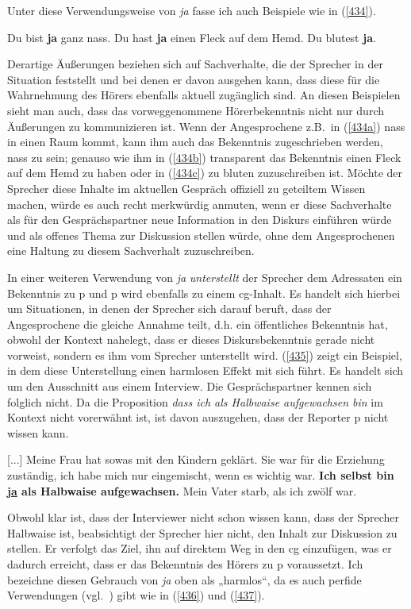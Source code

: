 Unter diese Verwendungsweise von \textit{ja} fasse ich auch Beispiele wie in (\ref{434}).

\begin{exe}
	\ex\label{434} 
	\begin{xlist}
		\ex\label{434a} Du bist \textbf{ja} ganz nass.	
 		\ex\label{434b}	Du hast \textbf{ja} einen Fleck auf dem Hemd.
 		\ex\label{434c}	Du blutest \textbf{ja}.				
 	\end{xlist}	
\end{exe}	
Derartige Äußerungen beziehen sich auf Sachverhalte, die der Sprecher in der Situation feststellt und bei denen er davon ausgehen kann, dass diese für die Wahrnehmung des Hörers ebenfalls aktuell zugänglich sind. An diesen Beispielen sieht man auch, dass das vorweggenommene Hörerbekenntnis nicht nur durch Äußerungen zu kommunizieren ist. Wenn der Angesprochene z.B.\ in (\ref{434a}) nass in einen Raum kommt, kann ihm auch das Bekenntnis zugeschrieben werden, nass zu sein; genauso wie ihm in (\ref{434b}) transparent das Bekenntnis einen Fleck auf dem Hemd zu haben oder in (\ref{434c}) zu bluten zuzuschreiben ist. Möchte der Sprecher diese Inhalte im aktuellen Gespräch offiziell zu geteiltem Wissen machen, würde es auch recht merkwürdig anmuten, wenn er diese Sachverhalte als für den Gesprächspartner neue Information in den Diskurs einführen würde und als offenes Thema zur Diskussion stellen würde, ohne dem Angesprochenen eine Haltung zu diesem Sachverhalt zuzuschreiben.
		
In einer weiteren Verwendung von \textit{ja} \emph{unterstellt} der Sprecher dem Adressaten ein Bekenntnis zu p und p wird ebenfalls zu einem cg-Inhalt. Es handelt sich hierbei um Situationen, in denen der Sprecher sich darauf beruft, dass der Angesprochene die gleiche Annahme teilt, d.h. ein öffentliches Bekenntnis hat, obwohl der Kontext nahelegt, dass er dieses Diskursbekenntnis gerade nicht vorweist, sondern es ihm vom Sprecher unterstellt wird. (\ref{435}) zeigt ein Beispiel, in dem diese Unterstellung einen harmlosen Effekt mit sich führt. Es handelt sich um den Ausschnitt aus einem Interview. Die Gesprächspartner kennen sich folglich nicht. Da die Proposition \textit{dass ich als Halbwaise aufgewachsen bin} im Kontext nicht vorerwähnt ist, ist davon auszugehen, dass der Reporter p nicht wissen kann.

\begin{exe}
	\ex\label{435} 

	[...] Meine Frau hat sowas mit den Kindern geklärt. Sie war für die Erziehung zuständig, ich habe mich nur eingemischt, wenn es wichtig war. \textbf{Ich selbst bin \underline{ja} als Halbwaise aufgewachsen.} Mein Vater starb, als ich zwölf war.   
	\hfill\hbox{\citet[204]{Rinas2006}}
\end{exe}
Obwohl klar ist, dass der Interviewer nicht schon wissen kann, dass der Sprecher Halbwaise ist, beabsichtigt der Sprecher hier nicht, den Inhalt zur Diskussion zu stellen. Er verfolgt das Ziel, ihn auf direktem Weg in den cg einzufügen, was er dadurch erreicht, dass er das Bekenntnis des Hörers zu p voraussetzt. Ich bezeichne diesen Gebrauch von \textit{ja} oben als „harmlos“, da es auch perfide Verwendungen (vgl.\ \citealt{Reiter1980}) gibt wie in (\ref{436}) und (\ref{437}).

